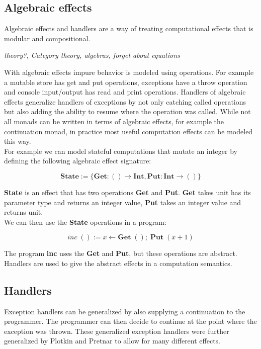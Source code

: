 \subsection{Algebraic effects}

Algebraic effects and handlers are a way of treating computational effects that is modular and compositional.

\textit{
theory?,
Category theory, algebras,
forget about equations
}

With algebraic effects impure behavior is modeled using operations.
For example a mutable store has get and put operations, exceptions have a throw operation and console input/output has read and print operations.
Handlers of algebraic effects generalize handlers of exceptions by not only catching called operations but also adding the ability to resume where the operation was called.
While not all monads can be written in terms of algebraic effects, for example the continuation monad, in practice most useful computation effects can be modeled this way.
\\
For example we can model stateful computations that mutate an integer by defining the following algebraic effect signature:

\[ \textbf{State} := \{ \textbf{Get} : () \rightarrow \textbf{Int}, \textbf{Put} : \textbf{Int} \rightarrow () \} \]

\textbf{State} is an effect that has two operations \textbf{Get} and \textbf{Put}. \textbf{Get} takes unit has its parameter type and returns an integer value, \textbf{Put} takes an integer value and returns unit.
\\
We can then use the \textbf{State} operations in a program:

\[ \textit{inc} \; () := x \leftarrow \textbf{Get} \; () ;\; \textbf{Put} \; (x + 1) \]

The program \textbf{inc} uses the \textbf{Get} and \textbf{Put}, but these operations are abstract.
Handlers are used to give the abstract effects in a computation semantics.

\subsection{Handlers}

Exception handlers can be generalized by also supplying a continuation to the programmer.
The programmer can then decide to continue at the point where the exception was thrown.
These generalized exception handlers were further generalized by Plotkin and Pretnar to allow for many different effects.


